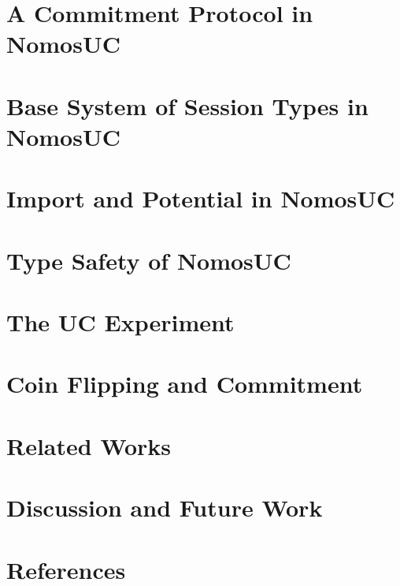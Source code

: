 \documentclass[acmsmall, screen, review, anonymous]{acmart}
\begin{document}
\section{A Commitment Protocol in NomosUC} \label{sec:example}


\section{Base System of Session Types in NomosUC} \label{sec:basic}


\section{Import and Potential in NomosUC} \label{sec:import}


\section{Type Safety of NomosUC} \label{sec:safety}


\section{The UC Experiment} \label{sec:execuc}


\section{Coin Flipping and Commitment} \label{sec:commitment}



\section{Related Works} \label{sec:related}


\section{Discussion and Future Work}


\section*{References}




\appendix
\end{document}
